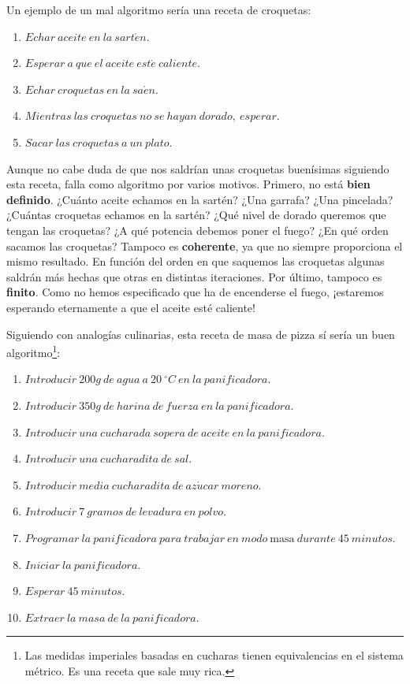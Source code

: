 Un ejemplo de un mal algoritmo sería una receta de croquetas:

\begin{enumerate}
	\item $Echar\ aceite\ en\ la\ sart\acute{e}n$.
	\item $Esperar\ a\ que\ el\ aceite\ est\acute{e}\ caliente$.
	\item $Echar\ croquetas\ en\ la\ sa\acute{e}n$.
	\item $Mientras\ las\ croquetas\ no\ se\ hayan\ dorado,\ esperar$.
	\item $Sacar\ las\ croquetas\ a\ un\ plato$.
\end{enumerate}

Aunque no cabe duda de que nos saldrían unas croquetas buenísimas siguiendo esta receta, falla como algoritmo por varios motivos.
Primero, no está \textbf{bien definido}.
¿Cuánto aceite echamos en la sartén?
¿Una garrafa?
¿Una pincelada?
¿Cuántas croquetas echamos en la sartén?
¿Qué nivel de dorado queremos que tengan las croquetas?
¿A qué potencia debemos poner el fuego?
¿En qué orden sacamos las croquetas?
Tampoco es \textbf{coherente}, ya que no siempre proporciona el mismo resultado.
En función del orden en que saquemos las croquetas algunas saldrán más hechas que otras en distintas iteraciones.
Por último, tampoco es \textbf{finito}.
Como no hemos especificado que ha de encenderse el fuego, ¡estaremos esperando eternamente a que el aceite esté caliente!

Siguiendo con analogías culinarias, esta receta de masa de pizza sí sería un buen algoritmo\footnote{Las medidas imperiales basadas en cucharas tienen equivalencias en el sistema métrico. Es una receta que sale muy rica.}:

\begin{enumerate}
	\item $Introducir\ 200g\ de\ agua\ a\ 20\ ^{\circ}C\ en\ la\ panificadora$.
	\item $Introducir\ 350g\ de\ harina\ de\ fuerza\ en\ la\ panificadora$.
	\item $Introducir\ una\ cucharada\ sopera\ de\ aceite\ en\ la\ panificadora$.
	\item $Introducir\ una\ cucharadita\ de\ sal$.
	\item $Introducir\ media\ cucharadita\ de\ az\acute{u}car\ moreno$.
	\item $Introducir\ 7\ gramos\ de\ levadura\ en\ polvo$.
	\item $Programar\ la\ panificadora\ para\ trabajar\ en\ modo\ \text{masa}\ durante\ 45\ minutos$.
	\item $Iniciar\ la\ panificadora$.
	\item $Esperar\ 45\ minutos$.
	\item $Extraer\ la\ masa\ de\ la\ panificadora$.
\end{enumerate}

